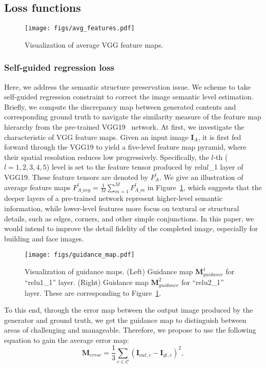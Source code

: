 \documentclass[journal]{IEEEtran}
\begin{document}
\subsection{Loss functions}

\begin{figure}[htpb]
	\centering
	\texttt{[image: figs/avg\_features.pdf]}
	\caption{Visualization of average VGG feature maps.}
	\label{fig:avg-features}
\end{figure}

\subsubsection{Self-guided regression loss}
Here, we address the semantic structure preservation issue. We scheme to take self-guided regression constraint to correct the image semantic level estimation. Briefly, we compute the discrepancy map between generated contents and corresponding ground truth to navigate the similarity measure of the feature map hierarchy from the pre-trained VGG19~\cite{VGG19} network. At first, we investigate the characteristic of VGG feature maps. Given an input image ${\mathbf{I}_A}$, it is first fed forward through the VGG19 to yield a five-level feature map pyramid, where their spatial resolution reduces low progressively. Specifically, the $l$-th ($l = 1,2,3,4,5$) level is set to the feature tensor produced by relu$l$\_1 layer of VGG19. These feature tensors are denoted by $F_A^l$. We give an illustration of average feature maps $F_{A\_avg}^l = \frac{1}{M}\sum\limits_{m = 1}^M {F_{A\_m}^l}$ in Figure~\ref{fig:avg-features}, which suggests that the deeper layers of a pre-trained network represent higher-level semantic information, while lower-level features more focus on textural or structural details, such as edges, corners, and other simple conjunctions. In this paper, we would intend to improve the detail fidelity of the completed image, especially for building and face images.

\begin{figure}[htpb]
	\centering
	\texttt{[image: figs/guidance\_map.pdf]}
	\caption{Visualization of guidance maps. (Left) Guidance map $\mathbf{M}_{guidance}^1$ for ``relu1\_1'' layer. (Right) Guidance map $\mathbf{M}_{guidance}^2$ for ``relu2\_1'' layer. These are corresponding to Figure~\ref{fig:avg-features}.}
	\label{fig:guidance-map}
\end{figure}

To this end, through the error map between the output image produced by the generator and ground truth, we get the guidance map to distinguish between areas of challenging and manageable. Therefore, we propose to use the following equation to gain the average error map:
\begin{equation}\label{eq:error-map}
{\mathbf{M}_{error}} = \frac{1}{3}\sum\limits_{c \in {\mathcal C}} {{{\left( {{\mathbf{I}_{out,c}} - {\mathbf{I}_{gt,c}}} \right)}^2 }},
\end{equation}
\end{document}
